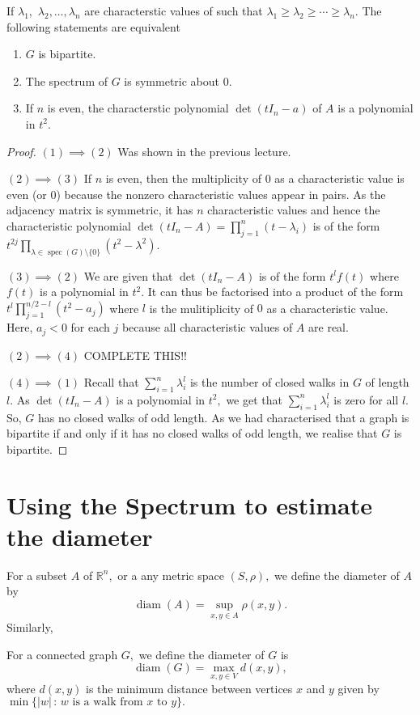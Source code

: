 
\begin{theorem}
	If $ \lambda_1,$ $ \lambda_2, \dotsc, \lambda_n$ are characterstic
	values of  
	such that $ \lambda_1 \geq \lambda_2 \geq \cdots \geq \lambda_n.$
	The following statements are equivalent
	
	\begin{enumerate}
		\item $G$ is bipartite.
		\item The spectrum of $G$ is symmetric about $0.$
		\item If $n$ is even, the characterstic polynomial $\det(t I_n - a)$ of $A$ is a polynomial in $t^2.$
	\end{enumerate}
\end{theorem}

\begin{proof}
	$(1) \implies (2)$ Was shown in the previous lecture.	

	$(2) \implies (3)$ If $n$ is even, then the multiplicity of $0$
	as a characteristic value is even (or $0$) because the nonzero
	characteristic values appear in pairs. As the adjacency matrix
	is symmetric, it has $n$ characteristic values and hence the
	characteristic polynomial $\det(t I_n - A) = \prod_{j=1}^{n} (t - \lambda_i)$
	is of the form $t^{2j} \prod_{ \lambda \in \operatorname{spec}(G) \setminus\{0\} } (t^2 - \lambda^2) .$

	$(3) \implies (2)$  We are given that
	$\det(t I_n - A)$ is of the form $t^l f(t)$ where
	$f(t)$ is a polynomial in $t^2.$ It can thus be 
	factorised into a product of the form 
	$ t^l \prod_{j=1}^{n/2 - l} (t^2 - a_j)$
	where $l$ is the mulitiplicity of $0$ as a characteristic value.
	Here, $a_j <0$ for each $j$ because all characteristic values
	of $A$ are real.

	$(2) \implies (4)$
	COMPLETE THIS!!

	$(4) \implies (1)$ 
	Recall that $\sum_{i=1}^{n} \lambda_i^l$ is the number of closed
	walks in $G$ of length $l.$ As $\det(t I_n - A)$ is a polynomial
	in $t^2,$ we get that $\sum_{i=1}^{n} \lambda_i^l$ is zero for
	all $l.$ So, $G$ has no closed walks of odd length. As we had 
	characterised that a graph is bipartite if and only if it has no
	closed walks of odd length, we realise that $G$ is bipartite.
\end{proof}

\section{Using the Spectrum to estimate the diameter}
For a subset $A$ of $\mathbb{R}^n,$ or a any metric space $(S,\rho),$
we define the diameter of $A$ by
$$ \operatorname{diam}(A) = \sup_{x,y \in A} \rho(x,y). $$
Similarly,
\begin{definition}
	For a connected graph $G,$ we define the diameter of $G$ is 
	$$\operatorname{diam}(G) = \max_{x,y \in V} d(x,y),$$
	where $d(x,y)$ is the minimum distance between vertices $x$ and
	$y$ given by $\min\{ \lvert w \rvert \, : \, w \text{ is a walk
	from } x \text{ to } y \}.$
\end{definition}

